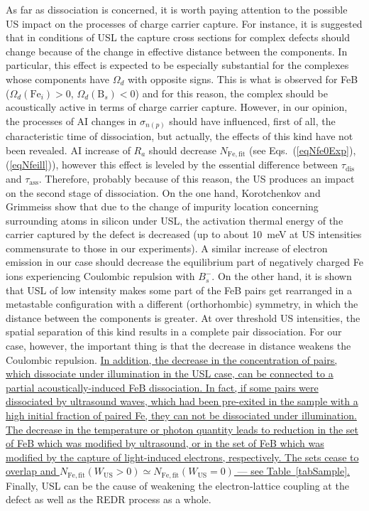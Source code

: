 \documentclass[%
 aip,jap,
 amsmath,amssymb,
 reprint,%
]{revtex4-1}
\begin{document}
As far as dissociation is concerned, it is worth paying attention to the possible  US impact on the processes of charge carrier capture.
For instance,  it is suggested \cite{Olikh2018JAP} that in conditions of USL the capture cross sections for complex defects should change because of the change in effective distance between the components.
In particular, this effect is expected to be especially substantial for the complexes whose components have $\Omega_d$ with opposite signs.
This is what is observed for FeB ($\Omega_d(\mathrm{Fe}_i)>0$, $\Omega_d(\mathrm{B}_s)<0$)
and for this reason, the complex should be acoustically active in terms of charge carrier capture.
However, in our opinion, the processes of AI changes in $\sigma_{n(p)}$ should have influenced,
first of all, the characteristic time of dissociation,
but actually, the effects of this kind have not been revealed.
AI increase of $R_a$ should decrease $N_\mathrm{Fe,fit}$ (see Eqs.~(\ref{eqNfe0Exp}),(\ref{eqNfeill})),
however this effect is leveled by the essential difference between $\tau_\mathrm{dis}$
and $\tau_\mathrm{ass}$.
Therefore, probably because of this reason, the US produces an impact on the second stage of dissociation.
On the one hand, Korotchenkov and Grimmeiss show\cite{Korotchenkov1995} that due to the change of impurity location concerning surrounding atoms in silicon under USL,
the activation thermal energy of the carrier captured by the defect  is decreased
(up to about 10~meV at US intensities commensurate to those in our experiments).
A similar increase of electron emission in our case should decrease the equilibrium part of negatively charged Fe ions experiencing Coulombic repulsion with $B_s^-$.
On the other hand, it is shown\cite{OlikhPSS} that USL of low intensity makes some part of the FeB pairs get rearranged in a metastable configuration with a different (orthorhombic) symmetry,
in which the distance between the components is  greater.
At over threshold US intensities, the spatial separation of this kind results in a complete pair dissociation.\cite{Ostapenko1995,Ostapenko1995SST,Ostapenko1994APL}
For our case, however, the important thing is that the decrease in distance weakens the Coulombic repulsion.
\textcolor[rgb]{0.00,0.07,1.00}{\uline{
In addition, the decrease in the concentration of pairs, which dissociate under illumination in the USL case, can be connected to a partial acoustically-induced FeB dissociation.
In fact, if some pairs were dissociated by  ultrasound waves, which had been pre-exited
in the sample with a high initial  fraction of paired Fe,
they can not be dissociated under illumination.
The decrease in the temperature  or photon quantity leads to reduction in the set of FeB which was modified by ultrasound,
or in the set of FeB which was modified by the capture of light-induced electrons, respectively.
The sets cease to overlap and $N_\mathrm{Fe,fit}(W_\mathrm{US}>0)\simeq N_\mathrm{Fe,fit}(W_\mathrm{US}=0)$ --- see Table~\ref{tabSample}.}}
Finally, USL can be the cause of weakening the electron-lattice coupling at the defect as well as the REDR process as a whole.
\end{document}
